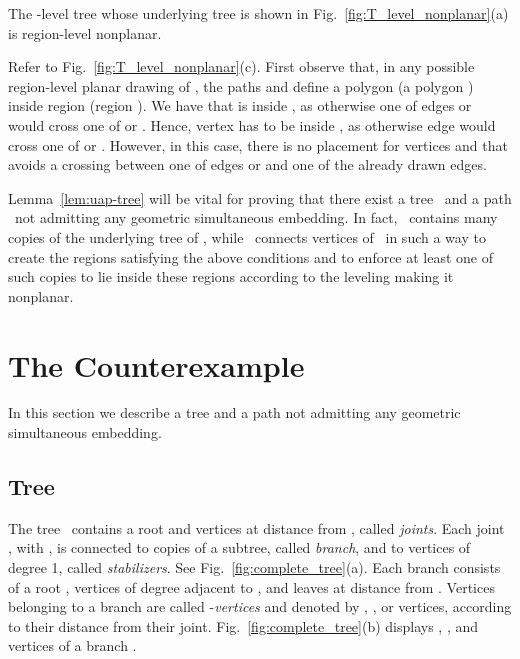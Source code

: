 \documentclass[a4paper,10pt]{llncs}
\renewenvironment{proof}
{{\bf Proof:}}{\hspace*{\fill}\par\vspace{2mm}}
\newcommand{\T}{\mbox{ }}
\renewcommand{\P}{\mbox{ }}
\newcommand{\remove}[1]{}
\begin{document}
\begin{lemma}\label{lem:uap-tree}
The -level tree  whose underlying tree is shown in Fig.~\ref{fig:T_level_nonplanar}(a) is region-level nonplanar.
\end{lemma}

\begin{proof}
Refer to Fig.~\ref{fig:T_level_nonplanar}(c). First observe that, in any possible region-level planar drawing of , the paths  and  define a polygon  (a polygon ) inside region  (region ). We have that  is inside , as otherwise one of edges  or  would cross one of  or . Hence, vertex  has to be inside , as otherwise edge  would cross one of  or . However, in this case, there is no placement for vertices  and  that avoids a crossing between one of edges  or  and one of the already drawn edges.
\end{proof}

Lemma~\ref{lem:uap-tree} will be vital for proving that there exist a tree \T and a path \P not admitting any geometric simultaneous embedding. In fact, \T contains many copies of the underlying tree of , while \P connects vertices of \T in such a way to create the regions satisfying the above conditions and to enforce at least one of such copies to lie inside these regions according to the leveling making it nonplanar.

\section{The Counterexample}\label{se:tree-path}

In this section we describe a tree  and a path  not admitting any geometric simultaneous embedding.

\subsection{Tree \T}
The tree \T contains a root  and  \remove{:= {535\choose 7}} vertices  at distance  from , called {\it joints}. Each joint , with , is connected to  copies  of a subtree, called {\it branch}, and to  vertices of degree 1, called {\it stabilizers}. See Fig.~\ref{fig:complete_tree}(a).
Each branch  consists of a root ,  vertices of degree  adjacent to , and  leaves at distance  from . Vertices belonging to a branch  are called -\emph{vertices} and denoted by , , or vertices, according to their distance from their joint. Fig.~\ref{fig:complete_tree}(b) displays , , and vertices of a branch .
\end{document}
